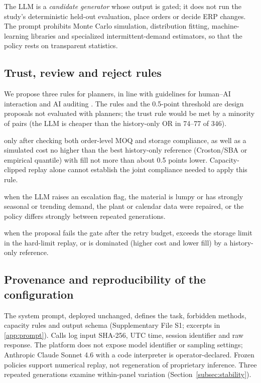 \documentclass[preprint,12pt,nonatbib]{elsarticle}
\let\cite\parencite
\begin{document}
The LLM is a \emph{candidate generator} whose output is gated; it does not run the study's deterministic held-out evaluation, place orders or decide ERP changes. The prompt prohibits Monte Carlo simulation, distribution fitting, machine-learning libraries and specialized intermittent-demand estimators, so that the policy rests on transparent statistics.

\subsection{Trust, review and reject rules}
\label{subsec:rules}
We propose three rules for planners, in line with guidelines for human--AI interaction and AI auditing \cite{amershi2019guidelines, raji2020accountability}. The rules and the 0.5-point threshold are design proposals not evaluated with planners; the trust rule would be met by a minority of pairs (the LLM is cheaper than the history-only OR in 74--77 of 346).
\begin{description}[leftmargin=*]
\item[Trust (consider after review)] only after checking both order-level MOQ and storage compliance, as well as a simulated cost no higher than the best history-only reference (Croston/SBA or empirical quantile) with fill not more than about 0.5 points lower. Capacity-clipped replay alone cannot establish the joint compliance needed to apply this rule.
\item[Escalate] when the LLM raises an escalation flag, the material is lumpy or has strongly seasonal or trending demand, the plant or calendar data were repaired, or the policy differs strongly between repeated generations.
\item[Reject] when the proposal fails the gate after the retry budget, exceeds the storage limit in the hard-limit replay, or is dominated (higher cost and lower fill) by a history-only reference.
\end{description}

\subsection{Provenance and reproducibility of the configuration}
\label{subsec:provenance}
The system prompt, deployed unchanged, defines the task, forbidden methods, capacity rules and output schema (Supplementary File S1; excerpts in \ref{app:prompt}). Calls log input SHA-256, UTC time, session identifier and raw response. The platform does not expose model identifier or sampling settings; Anthropic Claude Sonnet 4.6 with a code interpreter is operator-declared. Frozen policies support numerical replay, not regeneration of proprietary inference. Three repeated generations examine within-panel variation (Section~\ref{subsec:stability}).
\end{document}
